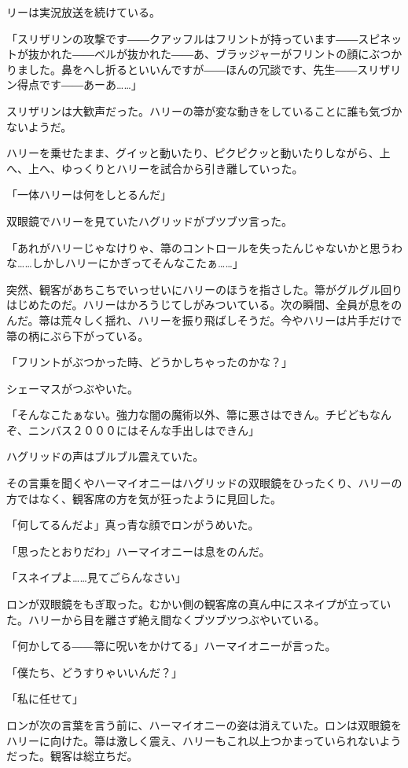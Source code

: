 \documentclass[10pt,a4paper]{article}
\begin{document}
\begin{CJK}{UTF8}{min}
リーは実況放送を続けている。

「スリザリンの攻撃です――クアッフルはフリントが持っています――スピネットが抜かれた――ベルが抜かれた――あ、ブラッジャーがフリントの顔にぶつかりました。鼻をへし折るといいんですが――ほんの冗談です、先生――スリザリン得点です――あーあ……」

スリザリンは大歓声だった。ハリーの箒が変な動きをしていることに誰も気づかないようだ。

ハリーを乗せたまま、グイッと動いたり、ピクピクッと動いたりしながら、上へ、上へ、ゆっくりとハリーを試合から引き離していった。

「一体ハリーは何をしとるんだ」

双眼鏡でハリーを見ていたハグリッドがブツブツ言った。

「あれがハリーじゃなけりゃ、箒のコントロールを失ったんじゃないかと思うわな……しかしハリーにかぎってそんなこたぁ……」

突然、観客があちこちでいっせいにハリーのほうを指さした。箒がグルグル回りはじめたのだ。ハリーはかろうじてしがみついている。次の瞬間、全員が息をのんだ。箒は荒々しく揺れ、ハリーを振り飛ばしそうだ。今やハリーは片手だけで箒の柄にぶら下がっている。

「フリントがぶつかった時、どうかしちゃったのかな？」

シェーマスがつぶやいた。

「そんなこたぁない。強力な闇の魔術以外、箒に悪さはできん。チビどもなんぞ、ニンバス２０００にはそんな手出しはできん」

ハグリッドの声はブルブル震えていた。

その言乗を聞くやハーマイオニーはハグリッドの双眼鏡をひったくり、ハリーの方ではなく、観客席の方を気が狂ったように見回した。

「何してるんだよ」真っ青な顔でロンがうめいた。

「思ったとおりだわ」ハーマイオニーは息をのんだ。

「スネイプよ……見てごらんなさい」

ロンが双眼鏡をもぎ取った。むかい側の観客席の真ん中にスネイプが立っていた。ハリーから目を離さず絶え間なくブツブツつぶやいている。

「何かしてる――箒に呪いをかけてる」ハーマイオニーが言った。

「僕たち、どうすりゃいいんだ？」

「私に任せて」

ロンが次の言葉を言う前に、ハーマイオニーの姿は消えていた。ロンは双眼鏡をハリーに向けた。箒は激しく震え、ハリーもこれ以上つかまっていられないようだった。観客は総立ちだ。


\end{CJK}
\end{document}
